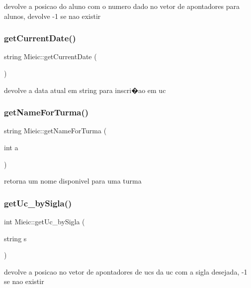 devolve a posicao do aluno com o numero dado no vetor de apontadores para alunos, devolve -\/1 se nao existir \hypertarget{class_mieic_a51b5c1ef83e7afb53ef57a392e8a39a4}{}\label{class_mieic_a51b5c1ef83e7afb53ef57a392e8a39a4} 
\subsubsection{\texorpdfstring{get\+Current\+Date()}{getCurrentDate()}}
{\footnotesize\ttfamily string Mieic\+::get\+Current\+Date (\begin{DoxyParamCaption}{ }\end{DoxyParamCaption})}

devolve a data atual em string para inscri�ao em uc \hypertarget{class_mieic_a43ccd6a808c81df87ba2eeee034d53db}{}\label{class_mieic_a43ccd6a808c81df87ba2eeee034d53db} 
\subsubsection{\texorpdfstring{get\+Name\+For\+Turma()}{getNameForTurma()}}
{\footnotesize\ttfamily string Mieic\+::get\+Name\+For\+Turma (\begin{DoxyParamCaption}\item[{int}]{a }\end{DoxyParamCaption})}

retorna um nome disponivel para uma turma \hypertarget{class_mieic_a75e517af6d5c97dc20d250bd774cc9df}{}\label{class_mieic_a75e517af6d5c97dc20d250bd774cc9df} 
\subsubsection{\texorpdfstring{get\+Uc\+\_\+by\+Sigla()}{getUc\_bySigla()}}
{\footnotesize\ttfamily int Mieic\+::get\+Uc\+\_\+by\+Sigla (\begin{DoxyParamCaption}\item[{string}]{s }\end{DoxyParamCaption})}

devolve a posicao no vetor de apontadores de ucs da uc com a sigla desejada, -\/1 se nao existir \hypertarget{class_mieic_a1d2dd57caef2bd1c8e7ec6a6d692ede1}{}\label{class_mieic_a1d2dd57caef2bd1c8e7ec6a6d692ede1} 
